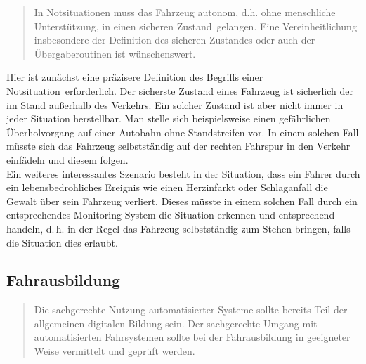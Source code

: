\documentclass[twoside,a4paper,12pt]{article}
\begin{document}
\begin{quote}
\glqq
In Notsituationen muss das Fahrzeug autonom, d.h. ohne menschliche Unterstützung, in
einen \glqq sicheren Zustand\grqq\ gelangen. Eine Vereinheitlichung insbesondere der Definition
des sicheren Zustandes oder auch der Übergaberoutinen ist wünschenswert.\grqq\mbox{~\cite[S. 13]{ek}}
\end{quote}

Hier ist zunächst eine präzisere Definition des Begriffs einer \glqq Notsituation\grqq\ erforderlich. Der sicherste Zustand eines Fahrzeug ist sicherlich der im Stand
außerhalb des Verkehrs. Ein solcher Zustand ist aber nicht immer in jeder Situation herstellbar. Man stelle sich beispielsweise einen gefährlichen Überholvorgang
auf einer Autobahn ohne Standstreifen vor. In einem solchen Fall müsste sich das Fahrzeug selbstständig auf der rechten Fahrspur in den Verkehr einfädeln und 
diesem folgen.\\

Ein weiteres interessantes Szenario besteht in der Situation, dass ein Fahrer durch ein lebensbedrohliches Ereignis wie einen Herzinfarkt oder Schlaganfall
die Gewalt über sein Fahrzeug verliert. Dieses müsste in einem solchen Fall durch ein entsprechendes Monitoring-System die Situation erkennen und entsprechend
\glqq handeln\grqq, d.\,h. in der Regel das Fahrzeug selbstständig zum Stehen bringen, falls die Situation dies erlaubt.\\

\subsection{Fahrausbildung} \label{Fahrausbildung}

\begin{quote}
\glqq
Die sachgerechte Nutzung automatisierter Systeme sollte bereits Teil der allgemeinen digitalen Bildung sein. Der sachgerechte 
Umgang mit automatisierten Fahrsystemen sollte
bei der Fahrausbildung in geeigneter Weise vermittelt und geprüft werden.\grqq\mbox{~\cite[S. 13]{ek}}
\end{quote}
\end{document}
